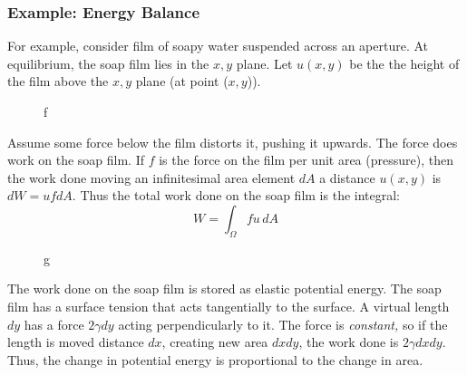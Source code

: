 \documentclass[12pt, a4paper, twoside, openright]{book}
\begin{document}
\subsubsection*{Example: Energy Balance}

For example, consider film of soapy water suspended across an aperture.  At equilibrium, the soap film lies in the $x,y$ plane.  Let $u(x,y)$ be the the height of the film above the $x,y$ plane (at point ($x,y$)).

\begin{figure}[ht]
\centering
{}
\caption{f}\label{f}
\end{figure}

Assume some force below the film distorts it, pushing it upwards.  The force does work on the soap film. If $f$ is the force on the film per unit area (pressure), then the work done moving an infinitesimal area element $dA$ a distance $u(x,y)$ is $dW = u f dA$. Thus the total work done on the soap film is the integral: 
\begin{equation}
W = \int_{\Omega} f u \,dA
\end{equation} 

\begin{figure}[ht]
\centering
{}
\caption{g}\label{g}
\end{figure}

The work done on the soap film is stored as elastic potential energy.  The soap film has a surface tension that acts tangentially to the surface.  A virtual length $dy$ has a force $2 \gamma dy$ acting perpendicularly to it. The force is \emph{constant,} so if the length is moved distance $dx$, creating new area $dxdy$, the work done is $ 2 \gamma dxdy$.  Thus, the change in potential energy is proportional to the change in area.
\end{document}
